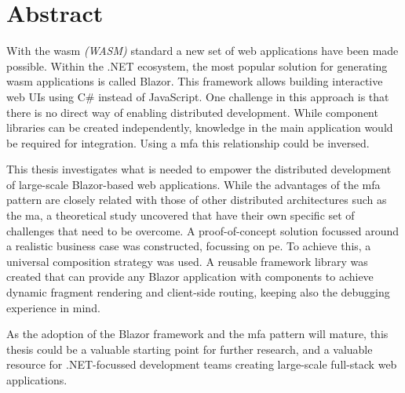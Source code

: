






\chapter*{Abstract}
\label{ch:abstract}


With the \gls{wasm} \textit{(WASM)} standard a new set of web applications have
been made possible. Within the .NET ecosystem, the most popular solution for
generating \gls{wasm} applications is called Blazor. This framework allows
building interactive web UIs using C\# instead of JavaScript. One challenge in
this approach is that there is no direct way of enabling distributed
development. While component libraries can be created independently, knowledge
in the main application would be required for integration. Using a \gls{mfa}
this relationship could be inversed. 

This thesis investigates what is needed to empower the distributed development
of large-scale Blazor-based web applications. While the advantages of the
\gls{mfa} pattern are closely related with those of other distributed
architectures such as the \gls{ma}, a theoretical study uncovered that
 have their own specific set of challenges that need to
be overcome. A proof-of-concept solution focussed around a realistic business
case was constructed, focussing on \gls{pe}. To achieve this, a universal
composition strategy was used. A reusable framework library was created that can
provide any Blazor application with components to achieve dynamic fragment
rendering and client-side routing, keeping also the debugging experience in
mind.

As the adoption of the Blazor framework and the \gls{mfa} pattern will mature,
this thesis could be a valuable starting point for further research, and a
valuable resource for .NET-focussed development teams
creating large-scale full-stack web applications. 